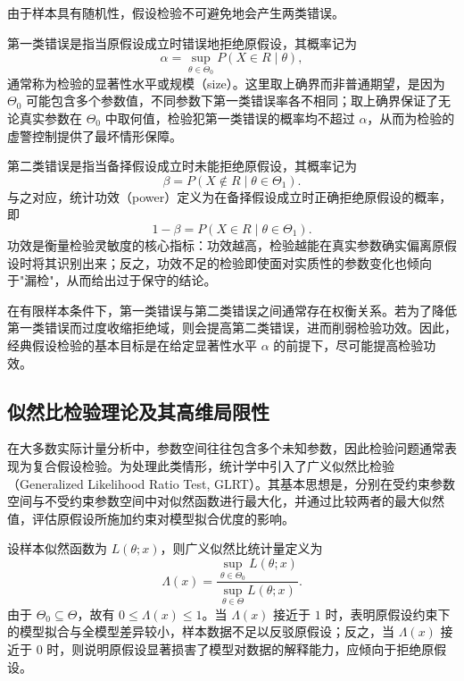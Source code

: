 由于样本具有随机性，假设检验不可避免地会产生两类错误。

第一类错误是指当原假设成立时错误地拒绝原假设，其概率记为
\begin{equation}
\alpha = \sup_{\theta\in\Theta_0} P(X\in R\mid \theta),
\end{equation}
通常称为检验的显著性水平或规模（size）。这里取上确界而非普通期望，是因为 $\Theta_0$ 可能包含多个参数值，不同参数下第一类错误率各不相同；取上确界保证了无论真实参数在 $\Theta_0$ 中取何值，检验犯第一类错误的概率均不超过 $\alpha$，从而为检验的虚警控制提供了最坏情形保障。

第二类错误是指当备择假设成立时未能拒绝原假设，其概率记为
\begin{equation}
\beta = P(X\notin R\mid \theta\in\Theta_1).
\end{equation}
与之对应，统计功效（power）定义为在备择假设成立时正确拒绝原假设的概率，即
\begin{equation}
1-\beta = P(X\in R\mid \theta\in\Theta_1).
\end{equation}
功效是衡量检验灵敏度的核心指标：功效越高，检验越能在真实参数确实偏离原假设时将其识别出来；反之，功效不足的检验即使面对实质性的参数变化也倾向于"漏检"，从而给出过于保守的结论。

在有限样本条件下，第一类错误与第二类错误之间通常存在权衡关系。若为了降低第一类错误而过度收缩拒绝域，则会提高第二类错误，进而削弱检验功效。因此，经典假设检验的基本目标是在给定显著性水平 $\alpha$ 的前提下，尽可能提高检验功效。

\subsection{似然比检验理论及其高维局限性}

在大多数实际计量分析中，参数空间往往包含多个未知参数，因此检验问题通常表现为复合假设检验。为处理此类情形，统计学中引入了广义似然比检验（Generalized Likelihood Ratio Test, GLRT）。其基本思想是，分别在受约束参数空间与不受约束参数空间中对似然函数进行最大化，并通过比较两者的最大似然值，评估原假设所施加约束对模型拟合优度的影响。

设样本似然函数为 $L(\theta;x)$，则广义似然比统计量定义为
\begin{equation}
\Lambda(x)=\frac{\sup_{\theta\in\Theta_0}L(\theta;x)}{\sup_{\theta\in\Theta}L(\theta;x)}.
\end{equation}
由于 $\Theta_0\subseteq\Theta$，故有 $0\leq \Lambda(x)\leq 1$。当 $\Lambda(x)$ 接近于 $1$ 时，表明原假设约束下的模型拟合与全模型差异较小，样本数据不足以反驳原假设；反之，当 $\Lambda(x)$ 接近于 $0$ 时，则说明原假设显著损害了模型对数据的解释能力，应倾向于拒绝原假设。

